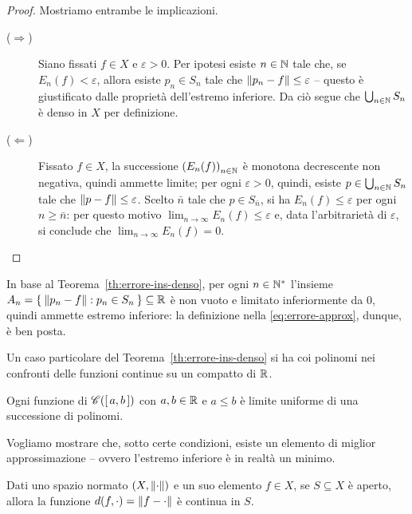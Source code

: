 	\begin{proof}
		Mostriamo entrambe le implicazioni.
		\begin{description}
			\item[(\(\Rightarrow\))] Siano fissati \(f \in X\) e \(\varepsilon > 0\). Per ipotesi esiste \(n \in \mathbb{N}\) tale che, se \(E_n (f) < \varepsilon\), allora esiste \(p_n \in S_n\) tale che \(\norm{p_n - f} \le \varepsilon\) -- questo è giustificato dalle proprietà dell'estremo inferiore. Da ciò segue che \(\bigcup_{n \in \mathbb{N}} S_n\) è denso in \(X\) per definizione.
			\item[(\(\Leftarrow\))] Fissato \(f \in X\), la successione \(\qty(E_n (f))_{n \in \mathbb{N}}\) è monotona decrescente non negativa, quindi ammette limite; per ogni \(\varepsilon > 0\), quindi, esiste \(p \in \bigcup_{n \in \mathbb{N}} S_n\) tale che \(\norm{p - f} \le \varepsilon\). Scelto \(\bar{n}\) tale che \(p \in S_{\bar{n}}\), si ha \(E_n (f) \le \varepsilon\) per ogni \(n \ge \bar{n}\): per questo motivo \(\lim_{n \to \infty} E_n (f) \le \varepsilon\) e, data l'arbitrarietà di \(\varepsilon\), si conclude che \(\lim_{n \to \infty} E_n (f) = 0\). \qedhere
		\end{description}
	\end{proof}

	\begin{osservazione}
		In base al Teorema~\ref{th:errore-ins-denso}, per ogni \(n \in \mathbb{N}^*\) l'insieme \(A_n = \Set{\norm{p_n - f} : p_n \in S_n} \subseteq \mathbb{R}\) è non vuoto e limitato inferiormente da \(0\), quindi ammette estremo inferiore: la definizione nella \eqref{eq:errore-approx}, dunque, è ben posta.
	\end{osservazione}

	Un caso particolare del Teorema~\ref{th:errore-ins-denso} si ha coi polinomi nei confronti delle funzioni continue su un compatto di \(\mathbb{R}\).

	\begin{teorema}\label{th:weierstrass-approx}
		Ogni funzione di \(\mathscr{C} ([\, a, b \,])\) con \(a, b \in \mathbb{R}\) e \(a \le b\) è limite uniforme di una successione di polinomi.
	\end{teorema}

	Vogliamo mostrare che, sotto certe condizioni, esiste un elemento di miglior approssimazione -- ovvero l'estremo inferiore è in realtà un minimo.
	
	\begin{lemma}\label{lem:distanza-funzione-continua}
		Dati uno spazio normato \((X, \norm{\cdot})\) e un suo elemento \(f \in X\), se \(S \subseteq X\) è aperto, allora la funzione \(d (f, \cdot) = \norm{f - \cdot}\) è continua in \(S\).
	\end{lemma}

